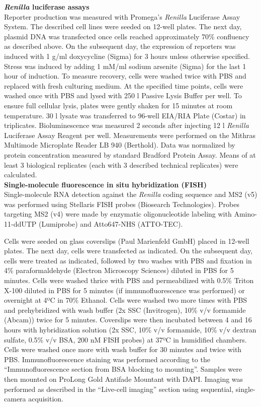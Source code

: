 \textbf{\textit{Renilla} luciferase assays} \\
Reporter production was measured with Promega’s \textit{Renilla} Luciferase Assay System.
The described cell lines were seeded on 12-well plates.
The next day, plasmid DNA was transfected once cells reached approximately 70\% confluency as described above.
On the subsequent day, the expression of reporters was induced with 1 \textmu g/ml
    doxycycline (Sigma) for 3 hours unless otherwise specified.
Stress was induced by adding 1 mM/ml sodium arsenite (Sigma) for the last 1 hour of induction.
To measure recovery, cells were washed twice with PBS and replaced with fresh culturing medium.
At the specified time points, cells were washed once with PBS and lysed with 250 \textmu l Passive Lysis Buffer per well.
To ensure full cellular lysis, plates were gently shaken for 15 minutes at room temperature.
30 \textmu l lysate was transferred to 96-well EIA/RIA Plate (Costar) in triplicates.
Bioluminescence was measured 2 seconds after injecting 12 \textmu l \textit{Renilla} Luciferase Assay Reagent per well.
Measurements were performed on the Mithras Multimode Microplate Reader LB 940 (Berthold).
Data was normalized by protein concentration measured by standard Bradford Protein Assay.
Means of at least 3 biological replicates (each with 3 described technical replicates) were calculated.
\\

\textbf{Single-molecule fluorescence in situ hybridization (FISH)} \\
Single-molecule RNA detection against the \textit{Renilla} coding sequence and MS2 (v5) was performed using Stellaris FISH probes (Biosearch Technologies).
Probes targeting MS2 (v4) were made by enzymatic oligonucleotide labeling \cite{gaspar_rna_2018} with Amino-11-ddUTP (Lumiprobe) and Atto647-NHS (ATTO-TEC). 

Cells were seeded on glass coverslips (Paul Marienfeld GmbH) placed in 12-well plates.
The next day, cells were transfected as indicated.
On the subsequent day, cells were treated as indicated, followed by two washes with PBS and fixation in 4\% paraformaldehyde (Electron Microscopy Sciences) diluted in PBS for 5 minutes.
Cells were washed thrice with PBS and permeabilized with 0.5\% Triton X-100 diluted in PBS for 5 minutes (if immunofluorescence was performed) or overnight at 4ºC in 70\% Ethanol.
Cells were washed two more times with PBS and prehybridized with wash buffer (2x SSC (Invitrogen), 10\% v/v formamide (Abcam)) twice for 5 minutes.
Coverslips were then incubated between 4 and 16 hours with hybridization solution (2x SSC, 10\% v/v formamide, 10\% v/v dextran sulfate, 0.5\% v/v BSA, 200 nM FISH probes) at 37ºC in humidified chambers.
Cells were washed once more with wash buffer for 30 minutes and twice with PBS.
Immunofluorescence staining was performed according to the “Immunofluorescence section from BSA blocking to mounting”.
Samples were then mounted on ProLong Gold Antifade Mountant with DAPI.
Imaging was performed as described in the “Live-cell imaging” section using sequential, single-camera acquisition.
\\

